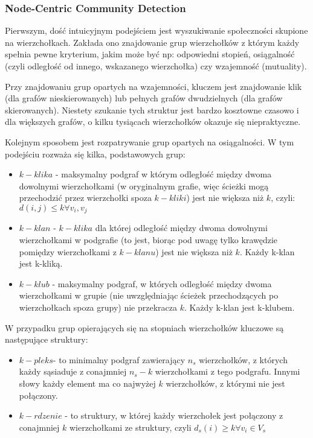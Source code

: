 \documentclass{article}
\begin{document}
\subsubsection{Node-Centric Community Detection}
Pierwszym, dość intuicyjnym podejściem jest wyszukiwanie społeczności skupione na wierzchołkach. Zakłada ono znajdowanie grup wierzchołków z którym każdy spełnia pewne kryterium, jakim może być np: odpowiedni stopień, osiągalność (czyli odległość od innego, wskazanego wierzchołka) czy wzajemność (mutuality).

Przy znajdowaniu grup opartych na  wzajemności, kluczem jest znajdowanie klik (dla grafów nieskierowanych) lub pełnych grafów dwudzielnych (dla grafów skierowanych). Niestety szukanie tych struktur jest bardzo kosztowne czasowo i dla większych grafów, o kilku tysiącach wierzchołków okazuje się niepraktyczne.

Kolejnym sposobem jest rozpatrywanie grup opartych na osiągalności. W tym podejściu rozważa się kilka, podstawowych grup:

\begin{itemize}
\item $k-klika$ - maksymalny podgraf w którym odległość między dwoma dowolnymi wierzchołkami (w oryginalnym grafie, więc ścieżki mogą przechodzić przez wierzchołki spoza $k-kliki$) jest nie większa niż $k$, czyli: $d(i,j)\leq k  \forall v_i , v_j $
\item  $k-klan$ - $k-klika$ dla której odległość między dwoma dowolnymi wierzchołkami w podgrafie (to jest, biorąc pod uwagę tylko krawędzie pomiędzy wierzchołkami z $k-klanu$) jest nie większa niż $k$. Każdy k-klan jest k-kliką.
\item $k - klub$ - maksymalny podgraf, w których odległość między dwoma wierzchołkami w grupie (nie uwzględniając ścieżek przechodzących po wierzchołkach spoza grupy) nie przekracza $k$. Każdy k-klan jest k-klubem.
\end{itemize}

W przypadku grup opierających się na stopniach wierzchołków kluczowe są następujące struktury:

\begin{itemize}
\item $k - pleks $- to minimalny podgraf zawierający $n_s$ wierzchołków, z których każdy sąsiaduje z conajmniej $n_s - k$ wierzchołkami z tego podgrafu. Innymi słowy każdy element ma co najwyżej $k$ wierzchołków, z którymi nie jest połączony.
\item $k - rdzenie$ -  to struktury, w której każdy wierzchołek jest połączony z conajmniej $k$ wierzchołkami ze struktury, czyli  $d_s(i)\geq k \forall v_i \in V_s $
\end{itemize}
\end{document}
